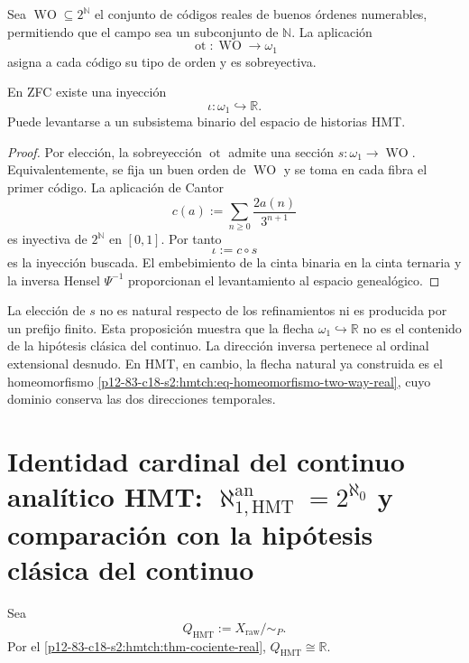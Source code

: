 Sea \(\operatorname{WO}\subseteq2^{\mathbb N}\) el conjunto de códigos
reales de buenos órdenes numerables, permitiendo que el campo sea un
subconjunto de \(\mathbb N\). La aplicación
\[
 \operatorname{ot}:\operatorname{WO}\longrightarrow\omega_1
\]
asigna a cada código su tipo de orden y es sobreyectiva.

\begin{proposition}
\label{p12-83-c19-s1:hmtch:prop-omega1-en-reales}
En ZFC existe una inyección
\[
 \iota:\omega_1\hookrightarrow\mathbb R.
\]
Puede levantarse a un subsistema binario del espacio de historias HMT.
\end{proposition}

\begin{proof}
Por elección, la sobreyección \(\operatorname{ot}\) admite una sección
\(s:\omega_1\to\operatorname{WO}\). Equivalentemente, se fija un buen
orden de \(\operatorname{WO}\) y se toma en cada fibra el primer código.
La aplicación de Cantor
\[
 c(a):=\sum_{n\geq0}\frac{2a(n)}{3^{n+1}}
\]
es inyectiva de \(2^{\mathbb N}\) en \([0,1]\). Por tanto
\[
 \iota:=c\circ s
\]
es la inyección buscada. El embebimiento de la cinta binaria en la cinta
ternaria y la inversa Hensel \(\Psi^{-1}\) proporcionan el levantamiento al
espacio genealógico.
\end{proof}

La elección de \(s\) no es natural respecto de los refinamientos ni es
producida por un prefijo finito. Esta proposición muestra que la flecha
\(\omega_1\hookrightarrow\mathbb R\) no es el contenido de la hipótesis
clásica del continuo. La dirección inversa pertenece al ordinal extensional
desnudo. En HMT, en cambio, la flecha natural ya construida es el
homeomorfismo \eqref{p12-83-c18-s2:hmtch:eq-homeomorfismo-two-way-real}, cuyo dominio
conserva las dos direcciones temporales.

\section{Identidad cardinal del continuo analítico HMT: \(\aleph_{1,\mathrm{HMT}}^{\mathrm{an}}=2^{\aleph_0}\) y comparación con la hipótesis clásica del continuo}

Sea
\[
 Q_{\mathrm{HMT}}:=X_{\mathrm{raw}}/\!\sim_P.
\]
Por el \cref{p12-83-c18-s2:hmtch:thm-cociente-real},
\(Q_{\mathrm{HMT}}\cong\mathbb R\).

